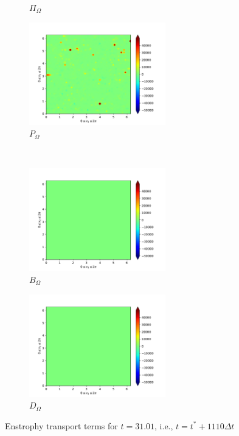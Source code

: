 \begin{figure}[H]
\begin{subfigure}{0.45\textwidth}
        \caption{$\Pi_{\Omega}$}
    \end{subfigure}
    \newline
    \begin{subfigure}{0.45\textwidth}
        \includegraphics[height=1.75in]{media/run-cds-65-25k/P-enst-449}
        \caption{$P_{\Omega}$}
    \end{subfigure}
    ~
    \begin{subfigure}{0.45\textwidth}
        \includegraphics[height=1.75in]{media/run-cds-65-25k/B-enst-449}
        \caption{$B_{\Omega}$}
    \end{subfigure}
    \newline
    \begin{subfigure}{0.45\textwidth}
        \includegraphics[height=1.75in]{media/run-cds-65-25k/D-enst-449}
        \caption{$D_{\Omega}$}
    \end{subfigure}
    \caption{Enstrophy transport terms for $t=31.01$, i.e., $t=t^{\ast} + 1110 \Delta t$}
\end{figure}

\newpage

